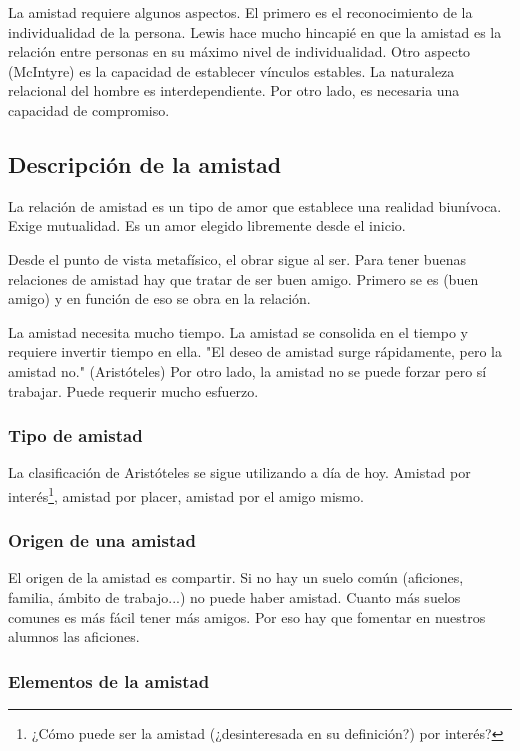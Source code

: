 \documentclass[palatino]{apuntesURJC}
\begin{document}
La amistad requiere algunos aspectos. El primero es el reconocimiento de la individualidad de la persona.
%
Lewis hace mucho hincapié en que la amistad es la relación entre personas en su máximo nivel de individualidad.
%
Otro aspecto (McIntyre) es la capacidad de establecer vínculos estables.
%
La naturaleza relacional del hombre es interdependiente.
%
Por otro lado, es necesaria una capacidad de compromiso.

\subsection{Descripción de la amistad}

La relación de amistad es un tipo de amor que establece una realidad biunívoca.
%
Exige mutualidad.
%
Es un amor elegido libremente desde el inicio.

Desde el punto de vista metafísico, el obrar sigue al ser.
%
Para tener buenas relaciones de amistad hay que tratar de ser buen amigo.
%
Primero se es (buen amigo) y en función de eso se obra en la relación.

La amistad necesita mucho tiempo.
%
La amistad se consolida en el tiempo y requiere invertir tiempo en ella. 
%
"El deseo de amistad surge rápidamente, pero la amistad no." (Aristóteles)
%
Por otro lado,
%
la amistad no se puede forzar pero sí trabajar. 
%
Puede requerir mucho esfuerzo.


\subsubsection{Tipo de amistad}

La clasificación de Aristóteles se sigue utilizando a día de hoy.
%
Amistad por interés\footnote{¿Cómo puede ser la amistad (¿desinteresada en su definición?) por interés?}, amistad por placer, amistad por el amigo mismo.


\subsubsection{Origen de una amistad}

El origen de la amistad es compartir. 
%
Si no hay un suelo común (aficiones, familia, ámbito de trabajo...) no puede haber amistad.
%
Cuanto más suelos comunes es más fácil tener más amigos.
%
Por eso hay que fomentar en nuestros alumnos las aficiones.

\subsubsection{Elementos de la amistad}
\end{document}

